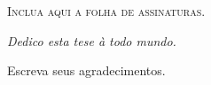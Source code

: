 \documentclass[
12pt,				%
openright,			%
oneside,			%
a4paper,		%
english,			%
brazil,				%
sumario=tradicional,
]{abntex2}
\begin{document}
	
	
\newpage
\vspace*{\fill}
\begin{center}
	\textsc{Inclua aqui a folha de assinaturas.}
\end{center}
\vspace*{\fill}
\newpage
%	
\newpage

%
%

\begin{dedicatoria}
	\vspace*{\fill}
	\centering
	\noindent
	\textit{Dedico esta tese \`{a} todo mundo.}
	\vspace*{\fill}
\end{dedicatoria}
%
\begin{agradecimentos}
	Escreva seus agradecimentos.
	
	
	\lipsum[1-3]
\end{agradecimentos}
\end{document}
